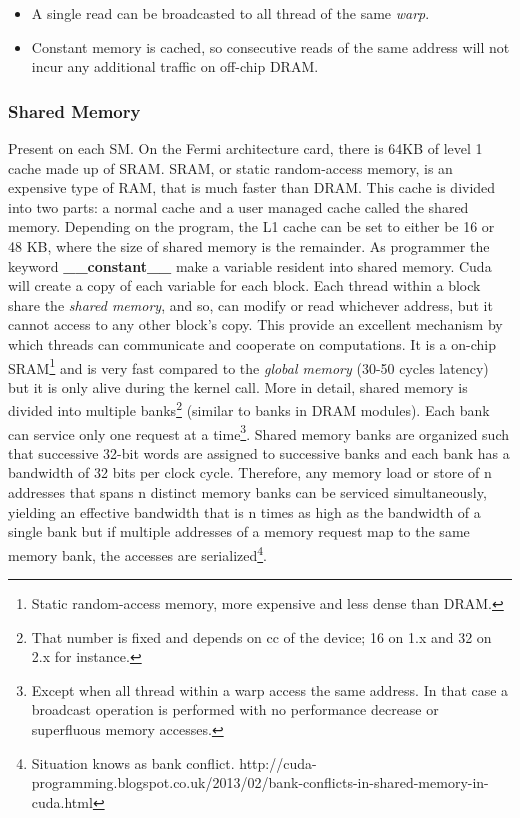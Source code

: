 \begin{itemize}\itemsep1pt
  \item A single read can be broadcasted to all thread of the same \emph{warp}.
  \item Constant memory is cached, so consecutive reads of the same address will
  not incur any additional traffic on off-chip DRAM.
\end{itemize}

\subsubsection{Shared Memory}\label{shareMemory}
Present on each SM. On the Fermi architecture card, there is 64KB of level 1
cache made up of SRAM. SRAM, or static random-access memory, is an expensive type of RAM, that
is much faster than DRAM. This cache is divided into two parts: a normal cache and a user managed
cache called the shared memory\cite{NvidiaprogGuide}. Depending on the program,
the L1 cache can be set to either be 16 or 48 KB, where the size of shared memory is the remainder.
As programmer the keyword \textbf{\_\_constant\_\_} make a variable resident
into shared memory. Cuda will create a copy of each variable for each block.
Each thread within a block share the \emph{shared memory}, and so, can modify or
read whichever address, but it cannot access to any other block's copy.
This provide an excellent mechanism by which threads can communicate and cooperate
on computations. It is a on-chip SRAM\footnote{Static random-access memory, more
expensive and less dense than DRAM.} and is very fast compared to the \emph{global
memory} (30-50 cycles latency) but it is only alive during the kernel call.
More in detail, shared memory is divided into multiple banks\footnote{That
number is fixed and depends on cc of the device; 16 on 1.x and 32 on 2.x for
instance.} (similar to banks in DRAM modules). Each bank can service only one
request at a time\footnote{Except when all thread within a warp access the
same address. In that case a broadcast operation is performed with no
performance decrease or superfluous memory accesses.}.
Shared memory banks are organized such that successive 32-bit words are assigned to successive banks and each bank has a bandwidth of 32 bits
per clock cycle. Therefore, any memory load or store of n addresses that spans n
distinct memory banks can be serviced simultaneously, yielding an effective
bandwidth that is n times as high as the bandwidth of a single bank but if
multiple addresses of a memory request map to the same memory bank, the accesses
are serialized\footnote{Situation knows as bank conflict.
http://cuda-programming.blogspot.co.uk/2013/02/bank-conflicts-in-shared-memory-in-cuda.html}.


